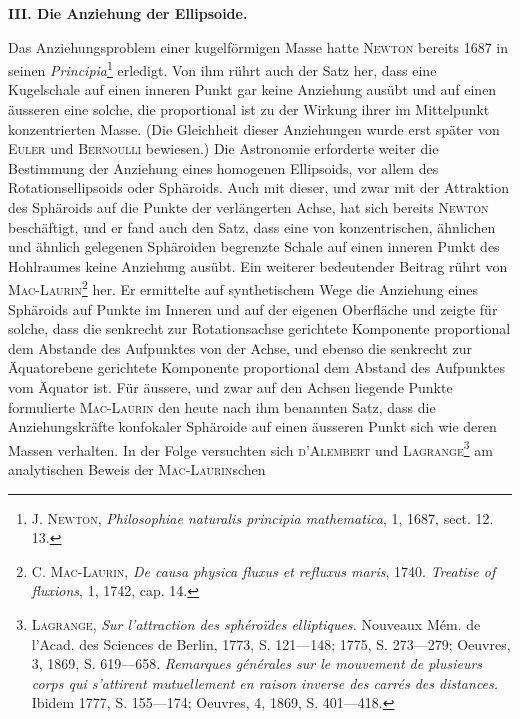 \clearpage\begingroup{}
\renewcommand{\thefootnote}{\arabic{footnote})}\setcounter{footnote}{58}
\begin{center}\textbf{III. Die Anziehung der Ellipsoide.}\par\medskip
{}\end{center}
\noindent\hspace*{\parindent}Das Anziehungsproblem einer kugelförmigen Masse hatte \textsc{Newton} bereits
1687 in seinen \textit{Principia}\footnote{\textsc{J. Newton}, \textit{Philosophiae naturalis principia mathematica}, 1, 1687, sect. 12. 13.} erledigt. Von ihm rührt auch der Satz her, dass
eine Kugelschale auf einen inneren Punkt gar keine Anziehung ausübt und
auf einen äusseren eine solche, die proportional ist zu der Wirkung ihrer im
Mittelpunkt konzentrierten Masse. (Die Gleichheit dieser Anziehungen wurde erst
später von \textsc{Euler} und \textsc{Bernoulli} bewiesen.) Die Astronomie erforderte weiter
die Bestimmung der Anziehung eines homogenen Ellipsoids, vor allem des
Rotationsellipsoids oder Sphäroids. Auch mit dieser, und zwar mit der
Attraktion des Sphäroids auf die Punkte der verlängerten Achse, hat sich
bereits \textsc{Newton} beschäftigt, und er fand auch den Satz, dass eine von
konzentrischen, ähnlichen und ähnlich gelegenen Sphäroiden begrenzte Schale
auf einen inneren Punkt des Hohlraumes keine Anziehung ausübt. Ein
weiterer bedeutender Beitrag rührt von \textsc{Mac-Laurin}\footnote{\textsc{C. Mac-Laurin}, \textit{De causa physica fluxus et refluxus maris}, 1740. \textit{Treatise of fluxions}, 1, 1742,
cap. 14.} her. Er ermittelte auf
\clearpage{}
\noindent synthetischem Wege die Anziehung eines Sphäroids auf Punkte im Inneren und
auf der eigenen Oberfläche und zeigte für solche, dass die senkrecht zur Rotationsachse
gerichtete Komponente proportional dem Abstande des Aufpunktes von
der Achse, und ebenso die senkrecht zur Äquatorebene gerichtete Komponente
proportional dem Abstand des Aufpunktes vom Äquator ist. Für äussere,
und zwar auf den Achsen liegende Punkte formulierte \textsc{Mac-Laurin} den heute
nach ihm benannten Satz, dass die Anziehungskräfte konfokaler Sphäroide
auf einen äusseren Punkt sich wie deren Massen verhalten. In der Folge
versuchten sich \textsc{d’Alembert} und \textsc{Lagrange}\footnote{\textsc{Lagrange}, \textit{Sur l’attraction des sphéroïdes elliptiques.} Nouveaux Mém. de l’Acad. des Sciences
de Berlin, 1773, S. 121—148; 1775, S. 273—279; Oeuvres, 3, 1869, S. 619—658. \textit{Remarques générales
sur le mouvement de plusieurs corps qui s’attirent mutuellement en raison inverse des carrés des distances.}
Ibidem 1777, S. 155—174; Oeuvres, 4, 1869, S. 401—418.} am analytischen Beweis der \textsc{Mac-Laurin}schen
